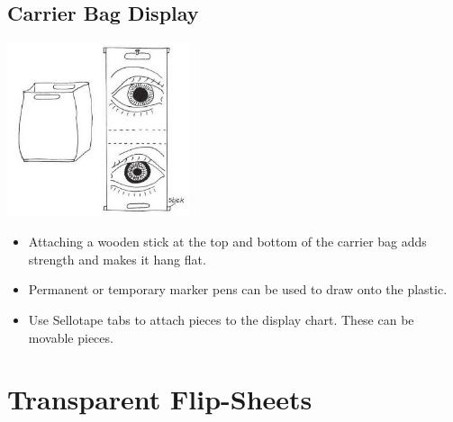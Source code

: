 \begin{multicols}{2}
\vfill
\columnbreak

\subsection{Carrier Bag Display}

\begin{center}
\includegraphics[width=0.4\textwidth]{./img/vso/carrier-bag.jpg}
\end{center}

\begin{itemize}
\item Attaching a wooden stick at the
top and bottom of the carrier
bag adds strength and makes it
hang flat.
\item Permanent or temporary marker pens can be
used to draw onto the plastic.
\item Use Sellotape tabs to attach
pieces to the display chart.
These can be movable pieces.
\end{itemize}


%


\section{Transparent Flip-Sheets}


\end{multicols}
